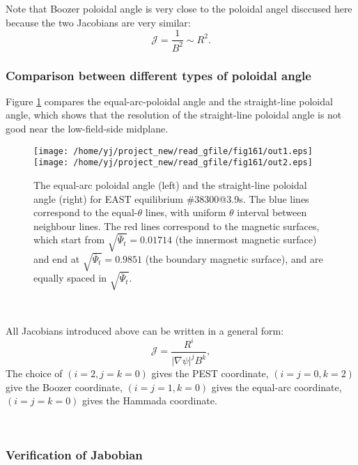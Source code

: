 \documentclass{article}
\begin{document}
Note that Boozer poloidal angle is very close to the poloidal angel disccused
here because the two Jacobians are very similar:
\begin{equation}
  \mathcal{J} = \frac{1}{B^2} \sim R^2 .
\end{equation}


\subsubsection{Comparison between different types of poloidal angle}

Figure \ref{8-23-1} compares the equal-arc-poloidal angle and the
straight-line poloidal angle, which shows that the resolution of the
straight-line poloidal angle is not good near the low-field-side midplane.

\begin{figure}[h]
  \texttt{[image: /home/yj/project\_new/read\_gfile/fig161/out1.eps]}\texttt{[image: /home/yj/project\_new/read\_gfile/fig161/out2.eps]}
  \caption{\label{8-23-1}The equal-arc poloidal angle (left) and the
  straight-line poloidal angle (right) for EAST equilibrium \#38300@3.9s. The
  blue lines correspond to the equal-$\theta$ lines, with uniform $\theta$
  interval between neighbour lines. The red lines correspond to the magnetic
  surfaces, which start from $\sqrt{\overline{\Psi}_t} = 0.01714$ (the
  innermost magnetic surface) and end at $\sqrt{\overline{\Psi}_t} = 0.9851$
  (the boundary magnetic surface), and are equally spaced in
  $\sqrt{\overline{\Psi}_t}$.}
\end{figure}

\

All Jacobians introduced above can be written in a general form:
\begin{equation}
  \mathcal{J} = \frac{R^i}{| \nabla \psi |^j B^k},
\end{equation}
The choice of $(i = 2, j = k = 0)$ gives the PEST coordinate, $(i = j = 0, k =
2)$ give the Boozer coordinate, $(i = j = 1, k = 0)$ gives the equal-arc
coordinate, $(i = j = k = 0)$ gives the Hammada coordinate.

\

\subsubsection{Verification of Jabobian}
\end{document}
